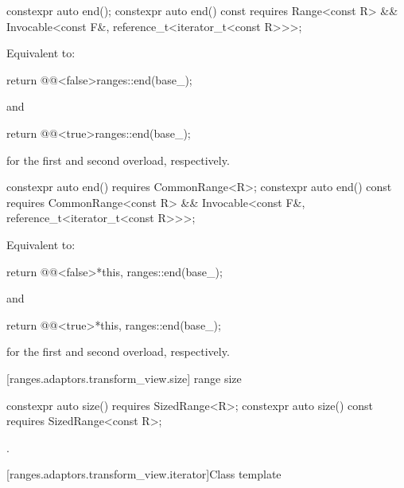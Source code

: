 %
\begin{itemdecl}
constexpr auto end();
constexpr auto end() const requires Range<const R> &&
  Invocable<const F&, reference_t<iterator_t<const R>>>;
\end{itemdecl}

\begin{itemdescr}
\pnum
\effects Equivalent to:
\begin{codeblock}
return @@<false>{ranges::end(base_)};
\end{codeblock}
  and
\begin{codeblock}
return @@<true>{ranges::end(base_)};
\end{codeblock}
for the first and second overload, respectively.
\end{itemdescr}

%
\begin{itemdecl}
constexpr auto end() requires CommonRange<R>;
constexpr auto end() const requires CommonRange<const R> &&
  Invocable<const F&, reference_t<iterator_t<const R>>>;
\end{itemdecl}

\begin{itemdescr}
\pnum
\effects Equivalent to:
\begin{codeblock}
return @@<false>{*this, ranges::end(base_)};
\end{codeblock}
  and
\begin{codeblock}
return @@<true>{*this, ranges::end(base_)};
\end{codeblock}
for the first and second overload, respectively.
\end{itemdescr}

[ranges.adaptors.transform_view.size]{ range size}

%
\begin{itemdecl}
constexpr auto size() requires SizedRange<R>;
constexpr auto size() const requires SizedRange<const R>;
\end{itemdecl}

\begin{itemdescr}
\pnum
\returns {}.
\end{itemdescr}

[ranges.adaptors.transform_view.iterator]{Class template }

